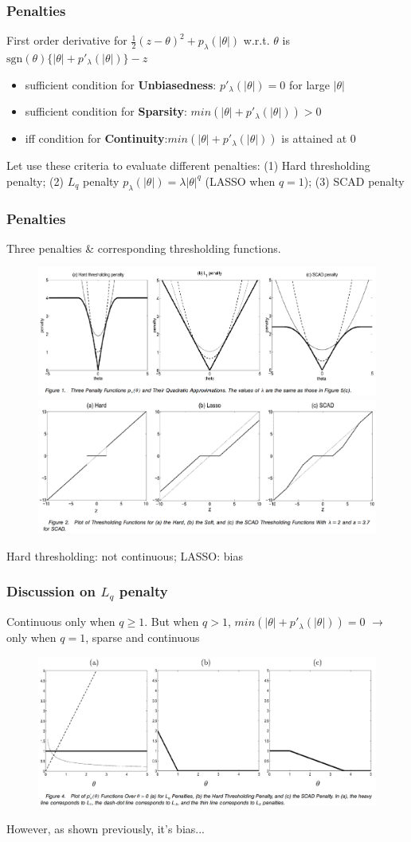 \documentclass{beamer}
\begin{document}
	
	\begin{frame}
		\frametitle{Penalties}
		First order derivative for $\frac{1}{2}(z-\theta)^2 + p_{\lambda}(|\theta|)$ w.r.t. $\theta$ is $\text{sgn}(\theta)\{|\theta| + p'_{\lambda}(|\theta|)\} - z$
		\begin{itemize}
			\item
			sufficient condition for \textbf{Unbiasedness}: $p'_{\lambda}(|\theta|)=0$ for large $|\theta|$
			\item
			sufficient condition for \textbf{Sparsity}: $min(|\theta| + p'_{\lambda}(|\theta|)) > 0$
			\item
			iff condition for \textbf{Continuity}:$min(|\theta| + p'_{\lambda}(|\theta|))$ is attained at 0
		\end{itemize}
		Let use these criteria to evaluate different penalties: (1) Hard thresholding penalty; (2) $L_q$ penalty $p_{\lambda}(|\theta|) = \lambda |\theta|^q$ (LASSO when $q=1$); (3) SCAD penalty
	\end{frame}
	
	
	\begin{frame}
		\frametitle{Penalties}
		Three penalties \& corresponding thresholding functions.
		\begin{figure}
			\includegraphics[width=0.7\linewidth]{image002.png}
			\includegraphics[width=0.7\linewidth]{image003.png}
		\end{figure}
		Hard thresholding: not continuous; LASSO: bias
	\end{frame}
	
	\begin{frame}
		\frametitle{Discussion on $L_q$ penalty}
		Continuous only when $q\geq 1$. But when $q > 1$, $min(|\theta| + p'_{\lambda}(|\theta|)) = 0$
		$\rightarrow$ only when $q = 1$, sparse and continuous
		\begin{figure}
			\includegraphics[width=0.8\linewidth]{image005.png}
		\end{figure}
		However, as shown previously, it's bias...
	\end{frame}
	
\end{document}
